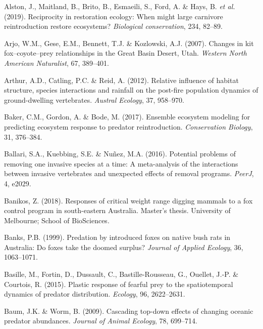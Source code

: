 \documentclass[11pt,a4paper,titlepage,twoside,openright]{style/unimelbthesis}
\begin{document}
\begin{mainmatter}
\leavevmode\hypertarget{ref-alston2019reciprocity}{}%
Alston, J., Maitland, B., Brito, B., Esmaeili, S., Ford, A. \& Hays, B. \emph{et al.} (2019). Reciprocity in restoration ecology: When might large carnivore reintroduction restore ecosystems? \emph{Biological conservation}, 234, 82--89.

\leavevmode\hypertarget{ref-arjo2007changes}{}%
Arjo, W.M., Gese, E.M., Bennett, T.J. \& Kozlowski, A.J. (2007). Changes in kit fox--coyote--prey relationships in the Great Basin Desert, Utah. \emph{Western North American Naturalist}, 67, 389--401.

\leavevmode\hypertarget{ref-arthur2012relative}{}%
Arthur, A.D., Catling, P.C. \& Reid, A. (2012). Relative influence of habitat structure, species interactions and rainfall on the post-fire population dynamics of ground-dwelling vertebrates. \emph{Austral Ecology}, 37, 958--970.

\leavevmode\hypertarget{ref-baker2017ensemble}{}%
Baker, C.M., Gordon, A. \& Bode, M. (2017). Ensemble ecosystem modeling for predicting ecosystem response to predator reintroduction. \emph{Conservation Biology}, 31, 376--384.

\leavevmode\hypertarget{ref-ballari2016potential}{}%
Ballari, S.A., Kuebbing, S.E. \& Nuñez, M.A. (2016). Potential problems of removing one invasive species at a time: A meta-analysis of the interactions between invasive vertebrates and unexpected effects of removal programs. \emph{PeerJ}, 4, e2029.

\leavevmode\hypertarget{ref-banikos2018responses}{}%
Banikos, Z. (2018). Responses of critical weight range digging mammals to a fox control program in south-eastern Australia. Master's thesis. University of Melbourne; School of BioSciences.

\leavevmode\hypertarget{ref-banks1999predation}{}%
Banks, P.B. (1999). Predation by introduced foxes on native bush rats in Australia: Do foxes take the doomed surplus? \emph{Journal of Applied Ecology}, 36, 1063--1071.

\leavevmode\hypertarget{ref-basille2015plastic}{}%
Basille, M., Fortin, D., Dussault, C., Bastille-Rousseau, G., Ouellet, J.-P. \& Courtois, R. (2015). Plastic response of fearful prey to the spatiotemporal dynamics of predator distribution. \emph{Ecology}, 96, 2622--2631.

\leavevmode\hypertarget{ref-baum2009cascading}{}%
Baum, J.K. \& Worm, B. (2009). Cascading top-down effects of changing oceanic predator abundances. \emph{Journal of Animal Ecology}, 78, 699--714.


\end{mainmatter}
\end{document}
